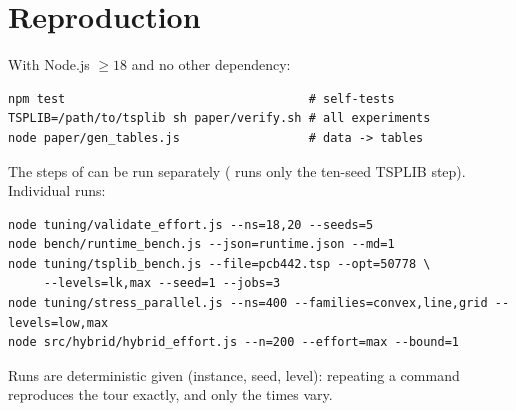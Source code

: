 \section{Reproduction}\label{app:repro}
With Node.js $\ge 18$ and no other dependency:
{\footnotesize
\begin{verbatim}
npm test                                  # self-tests
TSPLIB=/path/to/tsplib sh paper/verify.sh # all experiments
node paper/gen_tables.js                  # data -> tables
\end{verbatim}
}
The steps of  can be run separately ( runs only the
ten-seed TSPLIB step). Individual runs:
{\footnotesize
\begin{verbatim}
node tuning/validate_effort.js --ns=18,20 --seeds=5
node bench/runtime_bench.js --json=runtime.json --md=1
node tuning/tsplib_bench.js --file=pcb442.tsp --opt=50778 \
     --levels=lk,max --seed=1 --jobs=3
node tuning/stress_parallel.js --ns=400 --families=convex,line,grid --levels=low,max
node src/hybrid/hybrid_effort.js --n=200 --effort=max --bound=1
\end{verbatim}
}
Runs are deterministic given (instance, seed, level): repeating a command reproduces the tour exactly,
and only the times vary.
